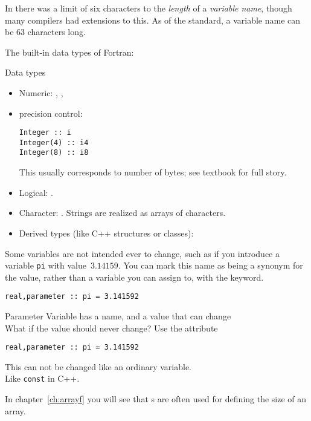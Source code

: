 \begin{remark}
  In  there was a limit of six characters to the
  \emph{length} of a \emph{variable name},
  though many compilers had extensions to this.
  As of the  standard, a variable name can be 63 characters long.
\end{remark}
The built-in data types of Fortran:

\begin{block}{Data types}
  \label{sl:ftypes}
  \begin{itemize}
  \item Numeric: , ,
    \item precision control:
\begin{lstlisting}
Integer :: i
Integer(4) :: i4
Integer(8) :: i8
\end{lstlisting}
This usually corresponds to number of bytes; see textbook for full story.
  \item Logical: .
  \item Character: . Strings are realized as
    arrays of characters.
  \item Derived types (like C++ structures or classes): 
  \end{itemize}  
\end{block}

Some variables are not intended ever to change,
such as if you introduce a variable \lstinline+pi+ with value~$3.14159$.
You can mark this name as being a synonym for the value,
rather than a variable you can assign to,
with the  keyword.
\begin{lstlisting}
real,parameter :: pi = 3.141592    
\end{lstlisting}

\begin{slide}{Parameter}
  \label{sl:fparameter}
  Variable has a name, and a value that can change\\
  What if the value should never change?
  Use the  attribute
\begin{lstlisting}
real,parameter :: pi = 3.141592    
\end{lstlisting}
This can not be changed like an ordinary variable.\\
Like \lstinline{const} in C++.
\end{slide}

In chapter~\ref{ch:arrayf} you will see that
s are often used for defining the size of an
array.

